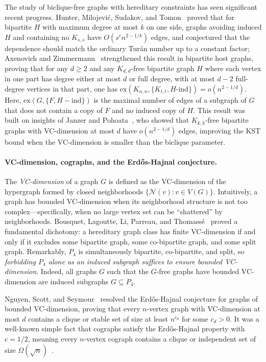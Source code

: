 \documentclass{article}
\theoremstyle{definition}
\theoremstyle{definition}
\theoremstyle{definition}
\theoremstyle{definition}
\theoremstyle{definition}
\theoremstyle{definition}
\theoremstyle{definition}
\theoremstyle{definition}
\theoremstyle{definition}
\theoremstyle{definition}
\begin{document}
The study of biclique-free graphs with hereditary constraints has seen significant recent progress.
Hunter, Milojevi\'c, Sudakov, and Tomon~\cite{Hunter2024} proved that for bipartite $H$ with maximum degree at most $k$ on one side, graphs avoiding induced $H$ and containing no $K_{s,s}$ have $O(s^{c} n^{2-1/k})$ edges, and conjectured that the dependence should match the ordinary Tur\'an number up to a constant factor; Axenovich and Zimmermann~\cite{AxenovichZimmermann2024} strengthened this result in bipartite host graphs, proving that for any $d \geq 2$ and any $K_{d,d}$-free bipartite graph $H$ where each vertex in one part has degree either at most $d$ or full degree, with at most $d-2$ full-degree vertices in that part, one has $\text{ex}(K_{n,n}, \{K_{t,t}, H\text{-ind}\}) = o(n^{2-1/d})$. Here, $\text{ex}\left( G, \{F, H-\text{ind} \} \right)$ is the maximal number of edges of a subgraph of $G$ that does not contain a copy of $F$ and no induced copy of $H$.
This result was built on insights of Janzer and Pohoata~\cite{JanzerPohoata2020}, who showed that $K_{k,k}$-free bipartite graphs with VC-dimension at most $d$ have $o(n^{2-1/d})$ edges, improving the KST bound when the VC-dimension is smaller than the biclique parameter.

\paragraph{VC-dimension, cographs, and the Erd\H{o}s-Hajnal conjecture.}
The \emph{VC-dimension} of a graph $G$ is defined as the VC-dimension of the hypergraph formed by closed neighborhoods $\{\mathscr{N}(v) : v \in V(G)\}$.
Intuitively, a graph has bounded VC-dimension when its neighborhood structure is not too complex---specifically, when no large vertex set can be ``shattered'' by neighborhoods.
Bousquet, Lagoutte, Li, Parreau, and Thomass\'e~\cite{Bousquet2014_identifyingCodes} proved a fundamental dichotomy: a hereditary graph class has finite VC-dimension if and only if it excludes some bipartite graph, some co-bipartite graph, and some split graph.
Remarkably, $P_4$ is simultaneously bipartite, co-bipartite, and split, so \emph{forbidding $P_4$ alone as an induced subgraph suffices to ensure bounded VC-dimension}. Indeed, all graphs $G$ such that the $G$-free graphs have bounded VC-dimension are induced subgraphs $G \subseteq P_4$.

Nguyen, Scott, and Seymour~\cite{Nguyen2023} resolved the Erd\H{o}s-Hajnal conjecture for graphs of bounded VC-dimension, proving that every $n$-vertex graph with VC-dimension at most $d$ contains a clique or stable set of size at least $n^{c_d}$ for some $c_d > 0$.
It was a well-known simple fact that cographs satisfy the Erd\H{o}s-Hajnal property with $c = 1/2$, meaning every $n$-vertex cograph contains a clique or independent set of size $\Omega(\sqrt{n})$~\cite{ErdosHajnal1989}.
\end{document}
